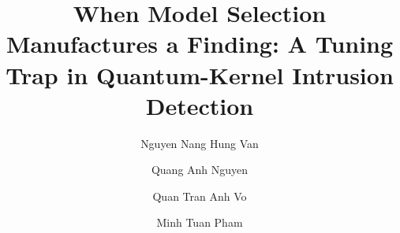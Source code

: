 \documentclass[runningheads]{llncs}
\newif\ifanonymous
\begin{document}
\title{When Model Selection Manufactures a Finding: A Tuning Trap in
Quantum-Kernel Intrusion Detection}

\ifanonymous
  \author{Anonymous Submission}
  \authorrunning{Anonymous}
  \titlerunning{A Tuning Trap in Quantum-Kernel IDS}
  \institute{}
\else
  \author{Nguyen Nang Hung Van \and
          Quang Anh Nguyen \and
          Quan Tran Anh Vo \and
          Minh Tuan Pham}
\fi

\maketitle
\end{document}
